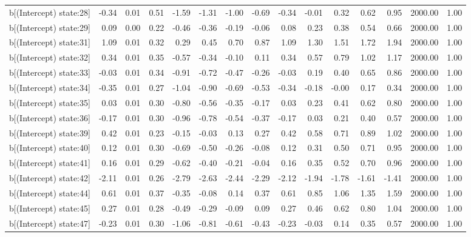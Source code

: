 \begin{table}[ht]
\begin{tabular}{rrrrrrrrrrrrrrr}
  b[(Intercept) state:28] & -0.34 & 0.01 & 0.51 & -1.59 & -1.31 & -1.00 & -0.69 & -0.34 & -0.01 & 0.32 & 0.62 & 0.95 & 2000.00 & 1.00 \\ 
  b[(Intercept) state:29] & 0.09 & 0.00 & 0.22 & -0.46 & -0.36 & -0.19 & -0.06 & 0.08 & 0.23 & 0.38 & 0.54 & 0.66 & 2000.00 & 1.00 \\ 
  b[(Intercept) state:31] & 1.09 & 0.01 & 0.32 & 0.29 & 0.45 & 0.70 & 0.87 & 1.09 & 1.30 & 1.51 & 1.72 & 1.94 & 2000.00 & 1.00 \\ 
  b[(Intercept) state:32] & 0.34 & 0.01 & 0.35 & -0.57 & -0.34 & -0.10 & 0.11 & 0.34 & 0.57 & 0.79 & 1.02 & 1.17 & 2000.00 & 1.00 \\ 
  b[(Intercept) state:33] & -0.03 & 0.01 & 0.34 & -0.91 & -0.72 & -0.47 & -0.26 & -0.03 & 0.19 & 0.40 & 0.65 & 0.86 & 2000.00 & 1.00 \\ 
  b[(Intercept) state:34] & -0.35 & 0.01 & 0.27 & -1.04 & -0.90 & -0.69 & -0.53 & -0.34 & -0.18 & -0.00 & 0.17 & 0.34 & 2000.00 & 1.00 \\ 
  b[(Intercept) state:35] & 0.03 & 0.01 & 0.30 & -0.80 & -0.56 & -0.35 & -0.17 & 0.03 & 0.23 & 0.41 & 0.62 & 0.80 & 2000.00 & 1.00 \\ 
  b[(Intercept) state:36] & -0.17 & 0.01 & 0.30 & -0.96 & -0.78 & -0.54 & -0.37 & -0.17 & 0.03 & 0.21 & 0.40 & 0.57 & 2000.00 & 1.00 \\ 
  b[(Intercept) state:39] & 0.42 & 0.01 & 0.23 & -0.15 & -0.03 & 0.13 & 0.27 & 0.42 & 0.58 & 0.71 & 0.89 & 1.02 & 2000.00 & 1.00 \\ 
  b[(Intercept) state:40] & 0.12 & 0.01 & 0.30 & -0.69 & -0.50 & -0.26 & -0.08 & 0.12 & 0.31 & 0.50 & 0.71 & 0.95 & 2000.00 & 1.00 \\ 
  b[(Intercept) state:41] & 0.16 & 0.01 & 0.29 & -0.62 & -0.40 & -0.21 & -0.04 & 0.16 & 0.35 & 0.52 & 0.70 & 0.96 & 2000.00 & 1.00 \\ 
  b[(Intercept) state:42] & -2.11 & 0.01 & 0.26 & -2.79 & -2.63 & -2.44 & -2.29 & -2.12 & -1.94 & -1.78 & -1.61 & -1.41 & 2000.00 & 1.00 \\ 
  b[(Intercept) state:44] & 0.61 & 0.01 & 0.37 & -0.35 & -0.08 & 0.14 & 0.37 & 0.61 & 0.85 & 1.06 & 1.35 & 1.59 & 2000.00 & 1.00 \\ 
  b[(Intercept) state:45] & 0.27 & 0.01 & 0.28 & -0.49 & -0.29 & -0.09 & 0.09 & 0.27 & 0.46 & 0.62 & 0.80 & 1.04 & 2000.00 & 1.00 \\ 
  b[(Intercept) state:47] & -0.23 & 0.01 & 0.30 & -1.06 & -0.81 & -0.61 & -0.43 & -0.23 & -0.03 & 0.14 & 0.35 & 0.57 & 2000.00 & 1.00 \\ 

\end{tabular}
\end{table}
